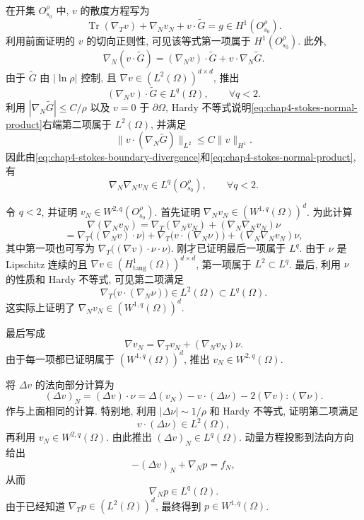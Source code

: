 在开集 $O_{s_0}^\rho$ 中, $v$ 的散度方程写为
\begin{equation}
 \operatorname{Tr}(\nabla_Tv)+\nabla_Nv_N+v\cdot\widetilde G
 =g\in H^1(O_{s_0}^\rho).
 \label{eq:chap4-stokes-boundary-divergence}
\end{equation}
利用前面证明的 $v$ 的切向正则性, 可见该等式第一项属于 $H^1(O_{s_0}^\rho)$. 此外,
\begin{equation}
 \nabla_N(v\cdot\widetilde G)
 =(\nabla_Nv)\cdot\widetilde G+v\cdot\nabla_N\widetilde G.
 \label{eq:chap4-stokes-normal-product}
\end{equation}
由于 $\widetilde G$ 由 $|\ln\rho|$ 控制, 且 $\nabla v\in(L^2(\Omega))^{d\times d}$, 推出
\begin{equation}
 (\nabla_Nv)\cdot\widetilde G\in L^q(\Omega),\qquad\forall q<2.
 \label{eq:chap4-stokes-normal-product-first}
\end{equation}
利用 $|\nabla_N\widetilde G|\leq C/\rho$ 以及 $v=0$ 于 $\partial\Omega$, Hardy 不等式说明\eqref{eq:chap4-stokes-normal-product}右端第二项属于 $L^2(\Omega)$, 并满足
\begin{equation}
 \|v\cdot(\nabla_N\widetilde G)\|_{L^2}\leq C\|v\|_{H^1}.
 \label{eq:chap4-stokes-normal-product-second}
\end{equation}
因此由\eqref{eq:chap4-stokes-boundary-divergence}和\eqref{eq:chap4-stokes-normal-product}, 有
\[
 \nabla_N\nabla_Nv_N\in L^q(O_{s_0}^\rho),\qquad\forall q<2.
\]

令 $q<2$, 并证明 $v_N\in W^{2,q}(O_{s_0}^\rho)$. 首先证明 $\nabla_Nv_N\in(W^{1,q}(\Omega))^d$. 为此计算
\[
 \nabla(\nabla_Nv_N)=\nabla_T(\nabla_Nv_N)+(\nabla_N\nabla_Nv_N)\nu
\]
\[
 =\nabla_T\bigl((\nabla_Nv)\cdot\nu\bigr)
 +\nabla_T\bigl(v\cdot(\nabla_N\nu)\bigr)
 +(\nabla_N\nabla_Nv_N)\nu,
\]
其中第一项也可写为 $\nabla_T\bigl((\nabla v)\cdot\nu\cdot\nu\bigr)$.
刚才已证明最后一项属于 $L^q$. 由于 $\nu$ 是 Lipschitz 连续的且 $\nabla v\in(H_{\mathrm{tang}}^1(\Omega))^{d\times d}$, 第一项属于 $L^2\subset L^q$. 最后, 利用 $\nu$ 的性质和 Hardy 不等式, 可见第二项满足
\begin{equation}
 \nabla_T\bigl(v\cdot(\nabla_N\nu)\bigr)\in L^2(\Omega)\subset L^q(\Omega).
 \label{eq:chap4-stokes-normal-velocity-second-term}
\end{equation}
这实际上证明了 $\nabla_Nv_N\in(W^{1,q}(\Omega))^d$.

最后写成
\[
 \nabla v_N=\nabla_Tv_N+(\nabla_Nv_N)\nu.
\]
由于每一项都已证明属于 $(W^{1,q}(\Omega))^d$, 推出 $v_N\in W^{2,q}(\Omega)$.

将 $\Delta v$ 的法向部分计算为
\[
 (\Delta v)_N=(\Delta v)\cdot\nu
 =\Delta(v_N)-v\cdot(\Delta\nu)-2(\nabla v):(\nabla\nu).
\]
作与上面相同的计算. 特别地, 利用 $|\Delta\nu|\sim1/\rho$ 和 Hardy 不等式, 证明第二项满足
\begin{equation}
 v\cdot(\Delta\nu)\in L^2(\Omega),
 \label{eq:chap4-stokes-laplacian-normal-term}
\end{equation}
再利用 $v_N\in W^{2,q}(\Omega)$. 由此推出 $(\Delta v)_N\in L^q(\Omega)$. 动量方程投影到法向方向给出
\[
 -(\Delta v)_N+\nabla_Np=f_N,
\]
从而
\[
 \nabla_Np\in L^q(\Omega).
\]
由于已经知道 $\nabla_Tp\in(L^2(\Omega))^d$, 最终得到 $p\in W^{1,q}(\Omega)$.

